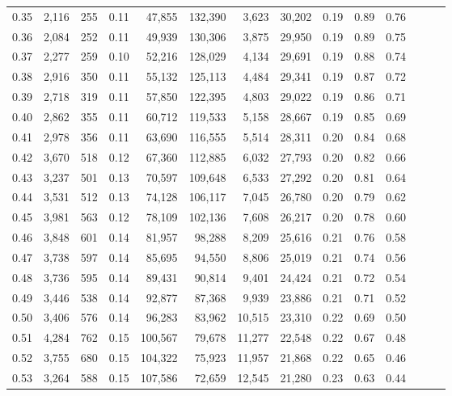 \begin{tabular}{rrrrrrrrrrrrrr}
0.35 &  2,116 &  255 &  0.11 &   47,855 &  132,390 &   3,623 &  30,202 &  0.19 &  0.89 &      0.76 \\
0.36 &  2,084 &  252 &  0.11 &   49,939 &  130,306 &   3,875 &  29,950 &  0.19 &  0.89 &      0.75 \\
0.37 &  2,277 &  259 &  0.10 &   52,216 &  128,029 &   4,134 &  29,691 &  0.19 &  0.88 &      0.74 \\
0.38 &  2,916 &  350 &  0.11 &   55,132 &  125,113 &   4,484 &  29,341 &  0.19 &  0.87 &      0.72 \\
0.39 &  2,718 &  319 &  0.11 &   57,850 &  122,395 &   4,803 &  29,022 &  0.19 &  0.86 &      0.71 \\
0.40 &  2,862 &  355 &  0.11 &   60,712 &  119,533 &   5,158 &  28,667 &  0.19 &  0.85 &      0.69 \\
0.41 &  2,978 &  356 &  0.11 &   63,690 &  116,555 &   5,514 &  28,311 &  0.20 &  0.84 &      0.68 \\
0.42 &  3,670 &  518 &  0.12 &   67,360 &  112,885 &   6,032 &  27,793 &  0.20 &  0.82 &      0.66 \\
0.43 &  3,237 &  501 &  0.13 &   70,597 &  109,648 &   6,533 &  27,292 &  0.20 &  0.81 &      0.64 \\
0.44 &  3,531 &  512 &  0.13 &   74,128 &  106,117 &   7,045 &  26,780 &  0.20 &  0.79 &      0.62 \\
0.45 &  3,981 &  563 &  0.12 &   78,109 &  102,136 &   7,608 &  26,217 &  0.20 &  0.78 &      0.60 \\
0.46 &  3,848 &  601 &  0.14 &   81,957 &   98,288 &   8,209 &  25,616 &  0.21 &  0.76 &      0.58 \\
0.47 &  3,738 &  597 &  0.14 &   85,695 &   94,550 &   8,806 &  25,019 &  0.21 &  0.74 &      0.56 \\
0.48 &  3,736 &  595 &  0.14 &   89,431 &   90,814 &   9,401 &  24,424 &  0.21 &  0.72 &      0.54 \\
0.49 &  3,446 &  538 &  0.14 &   92,877 &   87,368 &   9,939 &  23,886 &  0.21 &  0.71 &      0.52 \\
0.50 &  3,406 &  576 &  0.14 &   96,283 &   83,962 &  10,515 &  23,310 &  0.22 &  0.69 &      0.50 \\
0.51 &  4,284 &  762 &  0.15 &  100,567 &   79,678 &  11,277 &  22,548 &  0.22 &  0.67 &      0.48 \\
0.52 &  3,755 &  680 &  0.15 &  104,322 &   75,923 &  11,957 &  21,868 &  0.22 &  0.65 &      0.46 \\
0.53 &  3,264 &  588 &  0.15 &  107,586 &   72,659 &  12,545 &  21,280 &  0.23 &  0.63 &      0.44 \\

\end{tabular}

